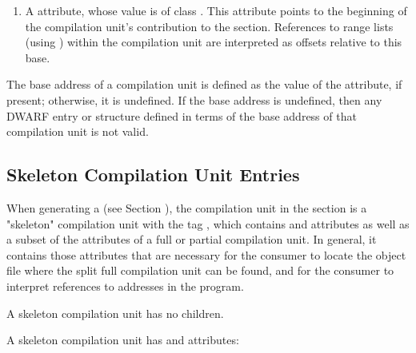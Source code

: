 \begin{enumerate}[1. ]
\item \hypertarget{chap:DWATrangesbaseforrangelists}{}
A \DWATrangesbaseDEFN{}
attribute, whose value is of class \CLASSrangelistptr.
This attribute points to the beginning of the compilation
unit's contribution to the \dotdebugranges{} section.
References to range lists (using \DWFORMsecoffset)
within the compilation unit are
interpreted as offsets relative to this base.

\end{enumerate}

The  base address of a compilation unit is defined as the
value of the \DWATlowpc{} attribute, if present; otherwise,
it is undefined. If the base address is undefined, then any
DWARF entry or structure defined in terms of the base address
of that compilation unit is not valid.

\subsection{Skeleton Compilation Unit Entries}
\label{chap:skeletoncompilationunitentries}
When generating a \splitDWARFobjectfile{} (see 
Section ), the
compilation unit in the \dotdebuginfo{} section is a "skeleton"
compilation unit with the tag \DWTAGcompileunit, which contains 
\DWATdwoname{} and \DWATdwoid{} attributes as well as a subset of the
attributes of a full or partial compilation unit. In general,
it contains those attributes that are necessary for the consumer
to locate the object file where the split full compilation unit
can be found, and for the consumer to interpret references to
addresses in the program. 


A skeleton compilation unit has no children.

A skeleton compilation unit has \DWATdwoname{} and 
\DWATdwoid{} attributes:

